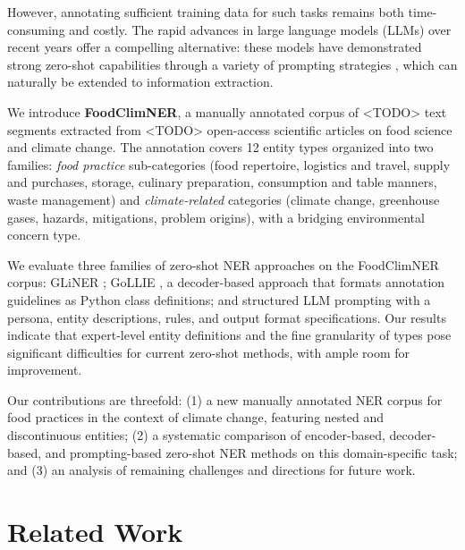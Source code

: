 \documentclass[11pt]{article}
\begin{document}
However, annotating sufficient training data for such tasks remains both time-consuming and costly.
The rapid advances in large language models (LLMs) over recent years \cite{brownLanguageModelsAre2020,ouyangTrainingLanguageModels2022,touvronLLaMAOpenEfficient2023,guoDeepSeekR1IncentivizesReasoning2025} offer a compelling alternative: these models have demonstrated strong zero-shot capabilities through a variety of prompting strategies \cite{kojimaLargeLanguageModels2022a,weiChainofThoughtPromptingElicits2023}, which can naturally be extended to information extraction.

We introduce \textbf{FoodClimNER}, a manually annotated corpus of <TODO> text segments extracted from <TODO> open-access scientific articles on food science and climate change. The annotation covers 12 entity types organized into two families: \textit{food practice} sub-categories (food repertoire, logistics and travel, supply and purchases, storage, culinary preparation, consumption and table manners, waste management) and \textit{climate-related} categories (climate change, greenhouse gases, hazards, mitigations, problem origins), with a bridging environmental concern type. 

We evaluate three families of zero-shot NER approaches on the FoodClimNER corpus: GLiNER \cite{zaratianaGLiNERGeneralistModel2023}; GoLLIE \cite{sainzGoLLIEAnnotationGuidelines2024}, a decoder-based approach that formats annotation guidelines as Python class definitions; and structured LLM prompting with a persona, entity descriptions, rules, and output format specifications. Our results indicate that expert-level entity definitions and the fine granularity of types pose significant difficulties for current zero-shot methods, with ample room for improvement.

Our contributions are threefold: (1) a new manually annotated NER corpus for food practices in the context of climate change, featuring nested and discontinuous entities; (2) a systematic comparison of encoder-based, decoder-based, and prompting-based zero-shot NER methods on this domain-specific task; and (3) an analysis of remaining challenges and directions for future work. 

\section{Related Work}
\end{document}
